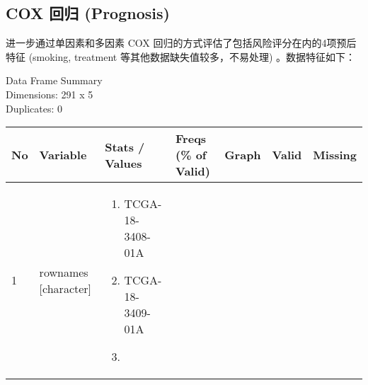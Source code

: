 \documentclass[
]{article}
\providecommand{\tightlist}{%
  \setlength{\itemsep}{0pt}\setlength{\parskip}{0pt}}
\begin{document}
\hypertarget{cox-ux56deux5f52-prognosis}{%
\subsection{COX 回归 (Prognosis)}\label{cox-ux56deux5f52-prognosis}}

进一步通过单因素和多因素 COX 回归的方式评估了包括风险评分在内的4项预后特征 (smoking, treatment 等其他数据缺失值较多，不易处理) 。数据特征如下：

Data Frame Summary\\
Dimensions: 291 x 5\\
Duplicates: 0

\begin{longtable}[]{@{}lllllll@{}}
\toprule
\begin{minipage}[b]{0.03\columnwidth}\raggedright
No\strut
\end{minipage} & \begin{minipage}[b]{0.16\columnwidth}\raggedright
Variable\strut
\end{minipage} & \begin{minipage}[b]{0.16\columnwidth}\raggedright
Stats / Values\strut
\end{minipage} & \begin{minipage}[b]{0.15\columnwidth}\raggedright
Freqs (\% of Valid)\strut
\end{minipage} & \begin{minipage}[b]{0.15\columnwidth}\raggedright
Graph\strut
\end{minipage} & \begin{minipage}[b]{0.08\columnwidth}\raggedright
Valid\strut
\end{minipage} & \begin{minipage}[b]{0.08\columnwidth}\raggedright
Missing\strut
\end{minipage}\tabularnewline
\midrule
\endhead
\begin{minipage}[t]{0.03\columnwidth}\raggedright
1\strut
\end{minipage} & \begin{minipage}[t]{0.16\columnwidth}\raggedright
rownames
{[}character{]}\strut
\end{minipage} & \begin{minipage}[t]{0.16\columnwidth}\raggedright
\begin{enumerate}
\def\labelenumi{\arabic{enumi}.}
\tightlist
\item
  TCGA-18-3408-01A
\item
  TCGA-18-3409-01A
\item

\end{enumerate}
\end{minipage}
\end{longtable}
\end{document}
